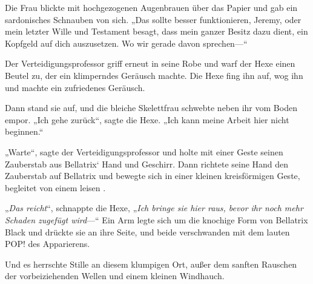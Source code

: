 Die Frau blickte mit hochgezogenen Augenbrauen über das Papier und gab ein sardonisches Schnauben von sich. „Das sollte besser funktionieren, Jeremy, oder mein letzter Wille und Testament besagt, dass mein ganzer Besitz dazu dient, ein Kopfgeld auf dich auszusetzen. Wo wir gerade davon sprechen—“

Der Verteidigungsprofessor griff erneut in seine Robe und warf der Hexe einen Beutel zu, der ein klimperndes Geräusch machte. Die Hexe fing ihn auf, wog ihn und machte ein zufriedenes Geräusch.

Dann stand sie auf, und die bleiche Skelettfrau schwebte neben ihr vom Boden empor. „Ich gehe zurück“, sagte die Hexe. „Ich kann meine Arbeit hier nicht beginnen.“

„Warte“, sagte der Verteidigungsprofessor und holte mit einer Geste seinen Zauberstab aus Bellatrix‘ Hand und Geschirr. Dann richtete seine Hand den Zauberstab auf Bellatrix und bewegte sich in einer kleinen kreisförmigen Geste, begleitet von einem leisen .

„\emph{Das reicht}“, schnappte die Hexe, „\emph{Ich bringe sie hier raus, bevor ihr noch mehr Schaden zugefügt wird}—“ Ein Arm legte sich um die knochige Form von Bellatrix Black und drückte sie an ihre Seite, und beide verschwanden mit dem lauten POP! des Apparierens.

Und es herrschte Stille an diesem klumpigen Ort, außer dem sanften Rauschen der vorbeiziehenden Wellen und einem kleinen Windhauch.

